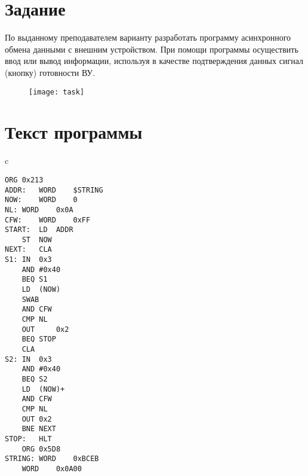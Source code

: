 \tableofcontents

\newpage

\section{Задание}
По выданному преподавателем варианту разработать программу асинхронного обмена данными с внешним устройством. При помощи программы осуществить ввод или вывод информации, используя в качестве подтверждения данных сигнал (кнопку) готовности ВУ.
\begin{figure}[H]
\centering
\texttt{[image: task]}
\label{pic:task}
\end{figure}

\section{Текст программы}
\begin{center}
\begin{tabular}{c}
\begin{lstlisting}[basicstyle=\ttfamily]
	ORG	0x213
ADDR:	WORD	$STRING
NOW:	WORD	0
NL:	WORD	0x0A
CFW:	WORD	0xFF
START:	LD	ADDR
	ST	NOW
NEXT:	CLA
S1:	IN	0x3
	AND	#0x40
	BEQ	S1
	LD	(NOW)
	SWAB
	AND	CFW
	CMP	NL
	OUT 	0x2
	BEQ	STOP
	CLA
S2:	IN	0x3
	AND	#0x40
	BEQ	S2
	LD	(NOW)+
	AND	CFW
	CMP	NL
	OUT	0x2
	BNE	NEXT
STOP:	HLT
	ORG	0x5D8
STRING:	WORD	0xBCEB
	WORD	0x0A00
\end{lstlisting}
\end{tabular}
\end{center}

